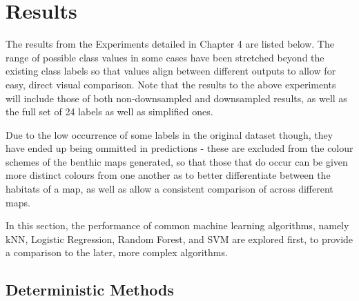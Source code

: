 \chapter{Results} \label{chap:results}

The results from the Experiments detailed in Chapter 4 are listed below. The range of possible class values in some cases have been stretched beyond the existing class labels so that values align between different outputs to allow for easy, direct visual comparison. Note that the results to the above experiments will include those of both non-downsampled and downsampled results, as well as the full set of 24 labels as well as simplified ones.

Due to the low occurrence of some labels in the original dataset though, they have ended up being ommitted in predictions - these are excluded from the colour schemes of the benthic maps generated, so that those that do occur can be given more distinct colours from one another as to better differentiate between the habitats of a map, as well as allow a consistent comparison of across different maps.

In this section, the performance of common machine learning algorithms, namely kNN, Logistic Regression, Random Forest, and SVM are explored first, to provide a comparison to the later, more complex algorithms.


\pagebreak
\section{Deterministic Methods}


